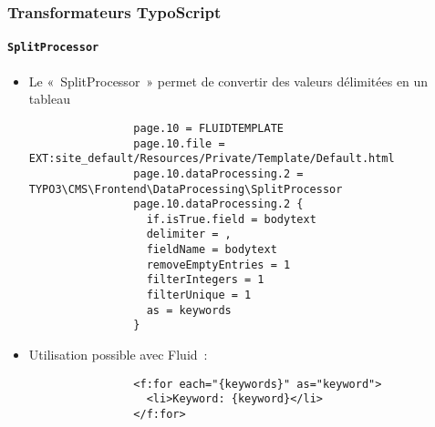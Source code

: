 \begin{frame}[fragile]
	\frametitle{Transformateurs TypoScript}
	\framesubtitle{\texttt{SplitProcessor}}

	\lstset{basicstyle=\tiny\ttfamily}

	\begin{itemize}

		\item Le «~SplitProcessor~» permet de convertir des valeurs délimitées en un tableau

			\begin{lstlisting}
				page.10 = FLUIDTEMPLATE
				page.10.file = EXT:site_default/Resources/Private/Template/Default.html
				page.10.dataProcessing.2 = TYPO3\CMS\Frontend\DataProcessing\SplitProcessor
				page.10.dataProcessing.2 {
				  if.isTrue.field = bodytext
				  delimiter = ,
				  fieldName = bodytext
				  removeEmptyEntries = 1
				  filterIntegers = 1
				  filterUnique = 1
				  as = keywords
				}
			\end{lstlisting}

		\item Utilisation possible avec Fluid~:

			\begin{lstlisting}
				<f:for each="{keywords}" as="keyword">
				  <li>Keyword: {keyword}</li>
				</f:for>
			\end{lstlisting}

	\end{itemize}

\end{frame}


